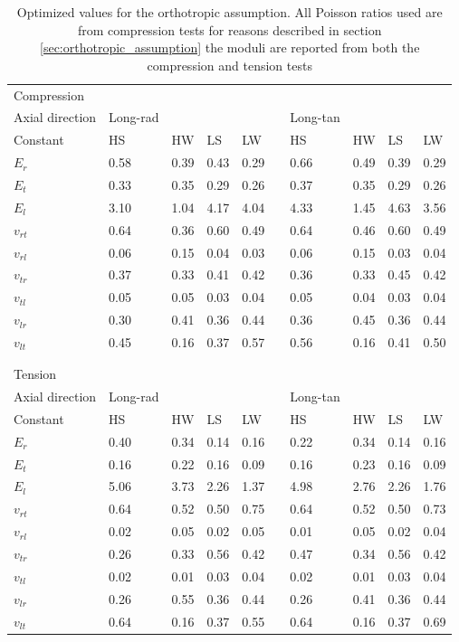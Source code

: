 \documentclass[10pt]{article}
\begin{document}
\begin{table}
\caption[Orthotropic material constants]{Optimized values for the orthotropic assumption. All Poisson ratios used are from compression tests for reasons described in section \ref{sec:orthotropic_assumption} the moduli are reported from both the compression and tension tests}
\label{table:optermised vals}
\begin{tabular}{l l l l l l l l l l}
\hline
Compression	&	&	&	&	&	&	&	&	&\\
Axial direction	&Long-rad	&	&	&	&	&Long-tan	&	&	&\\
Constant	&HS	&HW	&LS	&LW	&	&HS	&HW	&LS	&LW\\
\(E_r\)	&0.58	&0.39	&0.43	&0.29	&	&0.66	&0.49	&0.39	&0.29\\
\(E_t\)	&0.33	&0.35	&0.29	&0.26	&	&0.37	&0.35	&0.29	&0.26\\
\(E_l\)	&3.10	&1.04	&4.17	&4.04	&	&4.33	&1.45	&4.63	&3.56\\
\(v_{rt}\)	&0.64	&0.36	&0.60	&0.49	&	&0.64	&0.46	&0.60	&0.49\\
\(v_{rl}\)	&0.06	&0.15	&0.04	&0.03	&	&0.06	&0.15	&0.03	&0.04\\
\(v_{tr}\)	&0.37	&0.33	&0.41	&0.42	&	&0.36	&0.33	&0.45	&0.42\\
\(v_{tl}\)	&0.05	&0.05	&0.03	&0.04	&	&0.05	&0.04	&0.03	&0.04\\
\(v_{lr}\)	&0.30	&0.41	&0.36	&0.44	&	&0.36	&0.45	&0.36	&0.44\\
\(v_{lt}\)	&0.45	&0.16	&0.37	&0.57	&	&0.56	&0.16	&0.41	&0.50\\
&	&	&	&	&	&	&	&	&\\
\hline
&	&	&	&	&	&	&	&	&\\
Tension	&	&	&	&	&	&	&	&	&\\
Axial direction	&Long-rad	&	&	&	&	&Long-tan	&	&	&\\
Constant	&HS	&HW	&LS	&LW	&	&HS	&HW	&LS	&LW\\
\(E_r\)&0.40	&0.34	&0.14	&0.16	&	&0.22	&0.34	&0.14	&0.16\\
\(E_t\)&0.16	&0.22	&0.16	&0.09	&	&0.16	&0.23	&0.16	&0.09\\
\(E_l\)	&5.06	&3.73	&2.26	&1.37	&	&4.98	&2.76	&2.26	&1.76\\
\(v_{rt}\)&0.64	&0.52	&0.50	&0.75	&	&0.64	&0.52	&0.50	&0.73\\
\(v_{rl}\)&0.02	&0.05	&0.02	&0.05	&	&0.01	&0.05	&0.02	&0.04\\
\(v_{tr}\)&0.26	&0.33	&0.56	&0.42	&	&0.47	&0.34	&0.56	&0.42\\
\(v_{tl}\)	&0.02	&0.01	&0.03	&0.04	&	&0.02	&0.01	&0.03	&0.04\\
\(v_{lr}\)	&0.26	&0.55	&0.36	&0.44	&	&0.26	&0.41	&0.36	&0.44\\
\(v_{lt}\)	&0.64	&0.16	&0.37	&0.55	&	&0.64	&0.16	&0.37	&0.69\\

\hline
\end{tabular}
\end{table}
\end{document}
